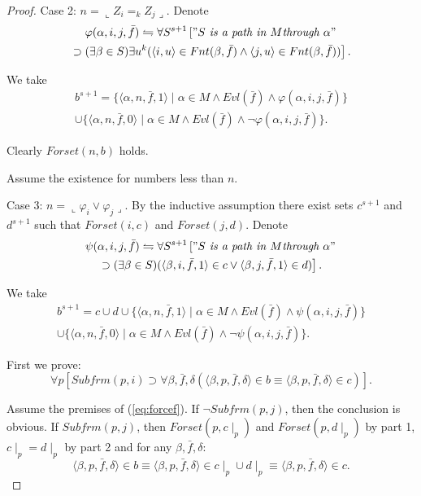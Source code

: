\documentclass{asl}
\theoremstyle{definition}
\begin{document}
\begin{proof}
Case 2: $n=\llcorner Z_i=_kZ_j\lrcorner$. Denote 
\begin{multline*}
\varphi(\alpha, i,j,\bar{f})\leftrightharpoons\forall S^{s+1}\left["S\textit{ is a path in }M
\textit{through }\alpha" 
\right.
\\
\left.
\supset(\exists\beta\in S)\exists u^k(\langle i,u\rangle\in Fnt(\beta,\bar{f})\wedge\langle j,u\rangle\in Fnt(\beta,\bar{f}))\right]. 
\end{multline*}

We take 
\begin{multline*}
b^{s+1}=\lbrace\langle\alpha, n,\bar{f},1\rangle\mid\alpha\in M\wedge Evl(\bar{f})\wedge\varphi(\alpha, i,j,\bar{f})\rbrace
\\
\cup
\lbrace\langle\alpha, n,\bar{f},0\rangle\mid\alpha\in M\wedge Evl(\bar{f})\wedge\neg\varphi(\alpha, i,j,\bar{f})\rbrace.
\end{multline*}

Clearly $Forset(n,b)$ holds.

Assume the existence for numbers less than $n$.

Case 3: $n=\llcorner\varphi_i\vee \varphi_j\lrcorner$. By the inductive assumption there exist sets $c^{s+1}$ and $d^{s+1}$ such that $Forset(i,c)$ and $Forset(j,d)$. Denote 
\begin{multline*}
\psi(\alpha, i,j,\bar{f})\leftrightharpoons\forall S^{s+1}\left["S\textit{ is a path in }M
\textit{through }\alpha" 
\right.
\\
\left.
\supset(\exists\beta\in S)(\langle \beta,i,\bar{f},1\rangle\in c\vee\langle \beta,j,\bar{f},1\rangle\in d)\right]. 
\end{multline*}

We take 
\begin{multline*}
b^{s+1}=c\cup d\cup\lbrace\langle\alpha, n,\bar{f},1\rangle\mid\alpha\in M\wedge Evl(\bar{f})\wedge\psi(\alpha, i,j,\bar{f})\rbrace
\\
\cup
\lbrace\langle\alpha, n,\bar{f},0\rangle\mid\alpha\in M\wedge Evl(\bar{f})\wedge\neg\psi(\alpha, i,j,\bar{f})\rbrace.
\end{multline*}

First we prove:
\begin{equation}
\forall p\left[Subfrm(p,i)\supset \forall\beta,\bar{f},\delta\left(\langle\beta, p,\bar{f},\delta\rangle\in b\equiv\langle\beta, p,\bar{f},\delta\rangle\in c \right) \right].
\label{eq:forcef}
\end{equation}

Assume the premises of (\ref{eq:forcef}). If $\neg Subfrm(p,j)$, then the conclusion is obvious. If $Subfrm(p,j)$, then $Forset(p,c\mid_p)$ and $Forset(p,d\mid_p)$ by part 1, $c\mid_p=d\mid_p$ by part 2 and for any $\beta,\bar{f},\delta$:
\[\langle\beta, p,\bar{f},\delta\rangle\in b\equiv
\langle\beta, p,\bar{f},\delta\rangle\in c\mid_p\cup d\mid_p\equiv\langle\beta, p,\bar{f},\delta\rangle\in c.\]


\end{proof}
\end{document}
